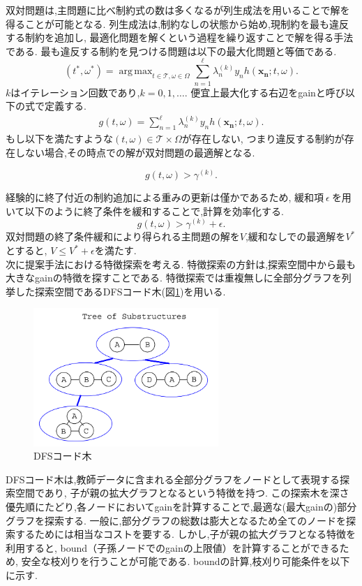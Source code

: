 \documentclass{zasshi-prml3}
\DeclareMathOperator*{\argmax}{arg\,max}
\theoremstyle{definition}
\begin{document}
双対問題は,主問題に比べ制約式の数は多くなるが列生成法を用いることで解を得ることが可能となる.
列生成法は,制約なしの状態から始め,現制約を最も違反する制約を追加し,
最適化問題を解くという過程を繰り返すことで解を得る手法である.
最も違反する制約を見つける問題は以下の最大化問題と等価である.
\begin{equation*}
	(t^{*}, \omega^{*}) = \argmax_{t \in \mathcal{T} , \omega \in \Omega} \sum_{n=1}^{\ell} \lambda_{n}^{(k)} y_{n} h(\bm{x_{n}} ; t, \omega).
\end{equation*}
$k$はイテレーション回数であり,$k=0,1,\ldots$.
便宜上最大化する右辺をgainと呼び以下の式で定義する.
\begin{align}
	\label{eq:gain}
	g(t, \omega) = \sum_{n=1}^{\ell} \lambda_{n}^{(k)} y_{n} h(\bm{x_{n}} ; t, \omega).
\end{align}
もし以下を満たすような$(t, \omega)\in \mathcal{T} \times \Omega$が存在しない,
つまり違反する制約が存在しない場合,その時点での解が双対問題の最適解となる.

\begin{equation*}
	 g(t, \omega) > \gamma^{(k)}.
\end{equation*}

経験的に終了付近の制約追加による重みの更新は僅かであるため,
緩和項$\ \epsilon \ $を用いて以下のように終了条件を緩和することで,計算を効率化する.
\begin{equation*}
	 g(t, \omega) > \gamma^{(k)} + \epsilon .
\end{equation*}
双対問題の終了条件緩和により得られる主問題の解を$V$,緩和なしでの最適解を$V^*$とすると,
$V \leq V^* + \epsilon$を満たす.\\

次に提案手法における特徴探索を考える.
特徴探索の方針は,探索空間中から最も大きなgainの特徴を探すことである.
特徴探索では重複無しに全部分グラフを列挙した探索空間であるDFSコード木(図\ref{dfscode_tree})を用いる.
\begin{figure}[t]
	\centering
	\includegraphics[width=70mm]{figure/dfscode_tree.png}
	\caption{DFSコード木}
	\label{dfscode_tree}
\end{figure}
DFSコード木は,教師データに含まれる全部分グラフをノードとして表現する探索空間であり,
子が親の拡大グラフとなるという特徴を持つ.
この探索木を深さ優先順にたどり,各ノードにおいてgainを計算することで,最適な(最大gainの)部分グラフを探索する.
一般に,部分グラフの総数は膨大となるため全てのノードを探索するためには相当なコストを要する.
しかし,子が親の拡大グラフとなる特徴を利用すると,
bound（子孫ノードでのgainの上限値）を計算することができるため,
安全な枝刈りを行うことが可能である.
boundの計算,枝刈り可能条件を以下に示す.
\end{document}

